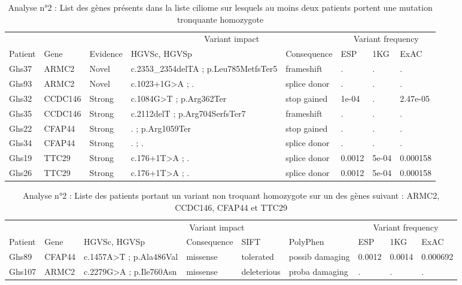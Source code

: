 \documentclass[12pt,twoside]{reedthesis}
\theoremstyle{definition}
\theoremstyle{definition}
\theoremstyle{remark}
\begin{document}
  \begin{landscape}
  \begin{longtable}[t]{llllllll}
  \caption{\label{tab:tabgrp1high}Analyse n°2 : List des gènes présents dans la liste ciliome sur lesquels au moins deux patients portent une mutation tronquante homozygote}\\
  \toprule
  \multicolumn{1}{c}{ } & \multicolumn{1}{c}{ } & \multicolumn{1}{c}{ } & \multicolumn{2}{c}{Variant impact} & \multicolumn{3}{c}{Variant frequency} \\
  \cmidrule(l{2pt}r{2pt}){4-5} \cmidrule(l{2pt}r{2pt}){6-8}
  Patient & Gene & Evidence & HGVSc, HGVSp & Consequence & ESP & 1KG & ExAC\\
  \midrule
  Ghs37 & ARMC2 & Novel & c.2353\_2354delTA ; p.Leu785MetfsTer5 & frameshift & . & . & .\\
  Ghs93 & ARMC2 & Novel & c.1023+1G>A ; . & splice donor & . & . & .\\
  Ghs32 & CCDC146 & Strong & c.1084G>T ; p.Arg362Ter & stop gained & 1e-04 & . & 2.47e-05\\
  Ghs35 & CCDC146 & Strong & c.2112delT ; p.Arg704SerfsTer7 & frameshift & . & . & .\\
  Ghs22 & CFAP44 & Strong & . ; p.Arg1059Ter & stop gained & . & . & .\\
  \addlinespace
  Ghs34 & CFAP44 & Strong & . ; . & splice donor & . & . & .\\
  Ghs19 & TTC29 & Strong & c.176+1T>A ; . & splice donor & 0.0012 & 5e-04 & 0.000158\\
  Ghs26 & TTC29 & Strong & c.176+1T>A ; . & splice donor & 0.0012 & 5e-04 & 0.000158\\
  \bottomrule
  \end{longtable}
  \end{landscape}
  
  \begin{landscape}
  \begin{longtable}[t]{lllllllll}
  \caption{\label{tab:tabgrp1moderate}Analyse n°2 : Liste des patients portant un variant non troquant homozygote sur un des gènes suivant : ARMC2, CCDC146, CFAP44  et  TTC29}\\
  \toprule
  \multicolumn{1}{c}{ } & \multicolumn{1}{c}{ } & \multicolumn{4}{c}{Variant impact} & \multicolumn{3}{c}{Variant frequency} \\
  \cmidrule(l{2pt}r{2pt}){3-6} \cmidrule(l{2pt}r{2pt}){7-9}
  Patient & Gene & HGVSc, HGVSp & Consequence & SIFT & PolyPhen & ESP & 1KG & ExAC\\
  \midrule
  Ghs89 & CFAP44 & c.1457A>T ; p.Ala486Val & missense & tolerated & possib damaging & 0.0012 & 0.0014 & 0.000692\\
  Ghs107 & ARMC2 & c.2279G>A ; p.Ile760Asn & missense & deleterious & proba damaging & . & . & .\\
  \bottomrule
  \end{longtable}
  \end{landscape}
  
\end{document}
